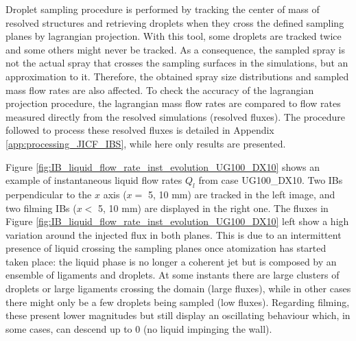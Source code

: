 Droplet sampling procedure is performed by tracking the center of mass of resolved structures and retrieving droplets when they cross the defined sampling planes by lagrangian projection. With this tool, some droplets are tracked twice and some others might never be tracked. As a consequence, the sampled spray is not the actual spray that crosses the sampling surfaces in the simulations, but an approximation to it. Therefore, the obtained spray size distributions and sampled mass flow rates are also affected. To check the accuracy of the lagrangian projection procedure, the lagrangian mass flow rates are compared to flow rates measured directly from the resolved simulations (resolved fluxes). The procedure followed to process these resolved fluxes is detailed in Appendix \ref{app:processing_JICF_IBS}, while here only results are presented. 

Figure \ref{fig:IB_liquid_flow_rate_inst_evolution_UG100_DX10} shows an example of instantaneous liquid flow rates $Q_l$ from case UG100\_DX10. Two IBs perpendicular to the $x$ axis ($x = $ 5, 10 mm) are tracked in the left image, and two filming IBs ($x < $ 5, 10 mm) are displayed in the right one. The fluxes in Figure \ref{fig:IB_liquid_flow_rate_inst_evolution_UG100_DX10} left show a high variation around the injected flux in both planes. This is due to an intermittent presence of liquid crossing the sampling planes once atomization has started taken place: the liquid phase is no longer a coherent jet but is composed by an ensemble of ligaments and droplets. At some instants there are large clusters of droplets or large ligaments crossing the domain (large fluxes), while in other cases there might only be a few droplets being sampled (low fluxes). Regarding filming, these present lower magnitudes but still display an oscillating behaviour which, in some cases, can descend up to $0$ (no liquid impinging the wall).



